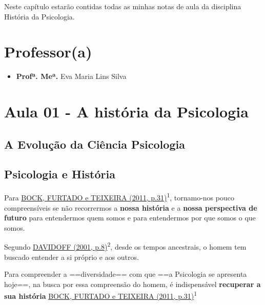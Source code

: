 \documentclass[
]{book}
\providecommand{\tightlist}{%
  \setlength{\itemsep}{0pt}\setlength{\parskip}{0pt}}
\theoremstyle{definition}
\theoremstyle{definition}
\theoremstyle{definition}
\theoremstyle{definition}
\theoremstyle{remark}
\begin{document}
Neste capítulo estarão contidas todas as minhas notas de aula da disciplina História da Psicologia.

\hypertarget{professora-1}{%
\section*{Professor(a)}\label{professora-1}}

\begin{itemize}
\tightlist
\item
  \textbf{Profª. Meª.} Eva Maria Lins Silva
\end{itemize}

\hypertarget{aula-01---a-histuxf3ria-da-psicologia}{%
\section{Aula 01 - A história da Psicologia}\label{aula-01---a-histuxf3ria-da-psicologia}}

\hypertarget{a-evoluuxe7uxe3o-da-ciuxeancia-psicologia}{%
\subsection*{A Evolução da Ciência Psicologia}\label{a-evoluuxe7uxe3o-da-ciuxeancia-psicologia}}

\hypertarget{psicologia-e-histuxf3ria}{%
\subsection*{Psicologia e História}\label{psicologia-e-histuxf3ria}}

Para \protect\hyperlink{bibliografia}{BOCK, FURTADO e TEIXEIRA (2011, p.31)}\textsuperscript{1}, tornamo-nos pouco compreensíveis se não recorrermos a \textbf{nossa história} e a \textbf{nossa perspectiva de futuro} para entendermos quem somos e para entendermos por que somos o que somos.

Segundo \protect\hyperlink{bibliografia}{DAVIDOFF (2001, p.8)}\textsuperscript{2}, desde os tempos ancestrais, o homem tem buscado entender a si próprio e aos outros.

Para compreender a ==diversidade== com que ==a Psicologia se apresenta hoje==, na busca por essa compreensão do homem, é indispensável \textbf{recuperar a sua história} \protect\hyperlink{bibliografia}{BOCK, FURTADO e TEIXEIRA (2011, p.31)}\textsuperscript{1}
\end{document}

